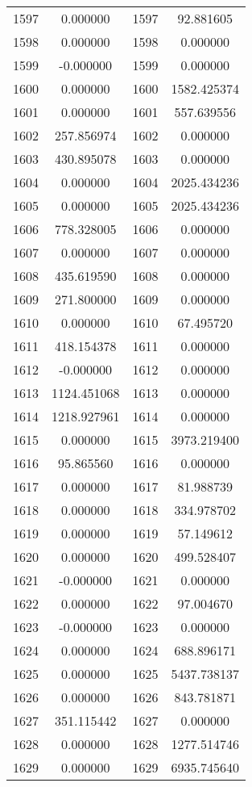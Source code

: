\documentclass[12pt]{article}
\begin{document}
\begin{longtable}{@{}cccc@{}}
1597 & 0.000000 & 1597 & 92.881605 \\
1598 & 0.000000 & 1598 & 0.000000 \\
1599 & -0.000000 & 1599 & 0.000000 \\
1600 & 0.000000 & 1600 & 1582.425374 \\
1601 & 0.000000 & 1601 & 557.639556 \\
1602 & 257.856974 & 1602 & 0.000000 \\
1603 & 430.895078 & 1603 & 0.000000 \\
1604 & 0.000000 & 1604 & 2025.434236 \\
1605 & 0.000000 & 1605 & 2025.434236 \\
1606 & 778.328005 & 1606 & 0.000000 \\
1607 & 0.000000 & 1607 & 0.000000 \\
1608 & 435.619590 & 1608 & 0.000000 \\
1609 & 271.800000 & 1609 & 0.000000 \\
1610 & 0.000000 & 1610 & 67.495720 \\
1611 & 418.154378 & 1611 & 0.000000 \\
1612 & -0.000000 & 1612 & 0.000000 \\
1613 & 1124.451068 & 1613 & 0.000000 \\
1614 & 1218.927961 & 1614 & 0.000000 \\
1615 & 0.000000 & 1615 & 3973.219400 \\
1616 & 95.865560 & 1616 & 0.000000 \\
1617 & 0.000000 & 1617 & 81.988739 \\
1618 & 0.000000 & 1618 & 334.978702 \\
1619 & 0.000000 & 1619 & 57.149612 \\
1620 & 0.000000 & 1620 & 499.528407 \\
1621 & -0.000000 & 1621 & 0.000000 \\
1622 & 0.000000 & 1622 & 97.004670 \\
1623 & -0.000000 & 1623 & 0.000000 \\
1624 & 0.000000 & 1624 & 688.896171 \\
1625 & 0.000000 & 1625 & 5437.738137 \\
1626 & 0.000000 & 1626 & 843.781871 \\
1627 & 351.115442 & 1627 & 0.000000 \\
1628 & 0.000000 & 1628 & 1277.514746 \\
1629 & 0.000000 & 1629 & 6935.745640 \\

\end{longtable}
\end{document}

